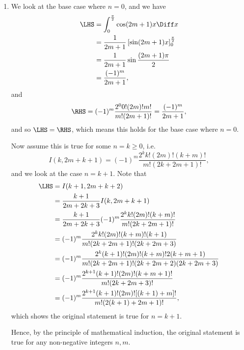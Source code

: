 \begin{enumerate}
    \item We look at the base case where \(n = 0\), and we have
          \begin{align*}
              \LHS & = \int_{0}^{\frac{\pi}{2}} \cos(2m + 1)x \Diff x                  \\
                   & = \frac{1}{2m + 1} \left[\sin(2m + 1)x\right]_{0}^{\frac{\pi}{2}} \\
                   & = \frac{1}{2m + 1} \sin \frac{(2m + 1)\pi}{2}                     \\
                   & = \frac{(-1)^m}{2m + 1},
          \end{align*}
          and
          \[
              \RHS = (-1)^m \frac{2^0 0! (2m)! m!}{m!(2m + 1)!} = \frac{(-1)^m}{2m + 1},
          \]
          and so \(\LHS = \RHS\), which means this holds for the base case where \(n = 0\).

          Now assume this is true for some \(n = k \geq 0\), i.e.
          \[
              I(k, 2m + k + 1) = (-1)^m \frac{2^k k! (2m)! (k + m)!}{m! (2k + 2m + 1)!},
          \]
          and we look at the case \(n = k + 1\). Note that
          \begin{align*}
              \LHS & = I(k + 1, 2m + k + 2)                                                                                    \\
                   & = \frac{k + 1}{2m + 2k + 3} I(k, 2m + k + 1)                                                              \\
                   & = \frac{k + 1}{2m + 2k + 3} (-1)^m \frac{2^k k! (2m)! (k + m)!}{m! (2k + 2m + 1)!}                        \\
                   & = (-1)^m \frac{2^k k! (2m)! (k + m)! (k + 1)}{m! (2k + 2m + 1)! (2k + 2m + 3)}                            \\
                   & = (-1)^m \frac{2^k (k + 1)! (2m)! (k + m)! 2 (k + m + 1) }{m! (2k + 2m + 1)! (2k + 2m + 2) (2k + 2m + 3)} \\
                   & = (-1)^m \frac{2^{k + 1} (k + 1)! (2m)! (k + m + 1)!}{m! (2k + 2m + 3)!}                                  \\
                   & = (-1)^m \frac{2^{k + 1} (k + 1)! (2m)! [(k + 1) + m]!}{m! (2(k + 1) + 2m + 1)!},
          \end{align*}
          which shows the original statement is true for \(n = k + 1\).

          Hence, by the principle of mathematical induction, the original statement is true for any non-negative integers \(n, m\).
\end{enumerate}